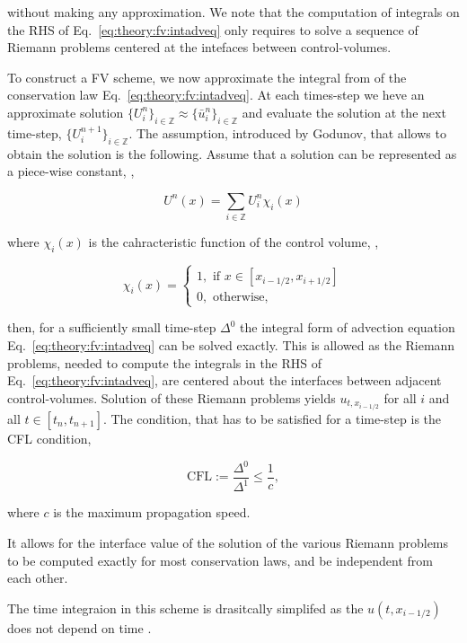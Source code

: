 without making any approximation. 
We note that the computation of integrals on the \ac{RHS} of Eq.~\eqref{eq:theory:fv:intadveq} only requires to solve a sequence of Riemann problems centered at the intefaces between control-volumes.

To construct a \ac{FV} scheme, we now approximate the integral from of the conservation law Eq.~\eqref{eq:theory:fv:intadveq}. At each times-step we heve an approximate solution $\{U_{i}^{n}\}_{i\in\mathbb{Z}} \approx \{\bar{u}_{i}^{n}\}_{i\in\mathbb{Z}}$ and evaluate the solution at the next time-step, $\{U_{i}^{n+1}\}_{i\in\mathbb{Z}}$. The assumption, introduced by Godunov, that allows to obtain the solution is the following. Assume that a solution can be represented as a piece-wise constant, \ie,

\begin{equation}
U^n(x) = \sum_{i\in\mathbb{Z}}U_i ^n \chi_i (x)
\end{equation}

where $\chi_i(x)$ is the cahracteristic function of the control volume, \ie,

\begin{equation}
\chi_i(x) = 
\begin{cases}
1, \text{ if } x\in[x_{i-1/2},x_{i+1/2}] \\
0, \text{ otherwise, }
\end{cases}
\end{equation}

then, for a sufficiently small time-step $\Delta^0$ the integral form of advection equation Eq.~\eqref{eq:theory:fv:intadveq} can be solved exactly. This is allowed as the Riemann problems, needed to compute the integrals in the \ac{RHS} of Eq.~\eqref{eq:theory:fv:intadveq}, are centered about the interfaces between adjacent control-volumes. Solution of these Riemann problems yields $u_{t, x_{i-1/2}}$ for all $i$ and all $t\in[t_n, t_{n+1}]$. The condition, that has to be satisfied for a time-step is the \ac{CFL} condition, 

\begin{equation}
\text{CFL}:=\frac{\Delta^0}{\Delta^1}\leq\frac{1}{c},
\end{equation}

where $c$ is the maximum propagation speed. 

It allows for the interface value of the solution of the various Riemann problems to be computed exactly for most conservation laws, and be independent from each other. 

The time integraion in this scheme is drasitcally simplifed as the $u(t, x_{i-1/2})$ does not depend on time \citep{LeVeque:1992}. 


